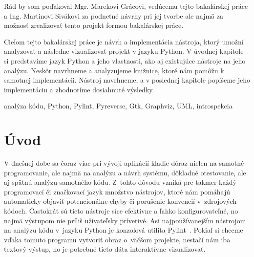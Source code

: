 \documentclass[11pt,oneside,final]{fithesis2}
\begin{document}
 \FrontMatter  
 \ThesisTitlePage

\begin{ThesisDeclaration}
\DeclarationText
\AdvisorName
\end{ThesisDeclaration}

\begin{ThesisThanks}
Rád by som poďakoval Mgr. Marekovi Grácovi, vedúcemu tejto bakalárskej práce a Ing. Martinovi Sivákovi za podnetné návrhy pri jej tvorbe ale najmä za možnosť zrealizovať tento projekt formou bakalárskej práce.
\end{ThesisThanks}

\begin{ThesisAbstract}
Cieľom tejto bakalárskej práce je návrh a implementácia nástroja, ktorý umožní analyzovať a následne vizualizovať projekt v jazyku Python. V úvodnej kapitole si predstavíme jazyk Python a jeho vlastnosti, ako aj existujúce nástroje na jeho analýzu. Neskôr navrhneme a analyzujeme knižnice, ktoré nám pomôžu k samotnej implementácii. Nástroj navrhneme, a v poslednej kapitole popíšeme jeho implementáciu a zhodnotíme dosiahnuté výsledky.
\end{ThesisAbstract}

\begin{ThesisKeyWords}
analýza kódu, Python, Pylint, Pyreverse, Gtk, Graphviz, UML, introspekcia
\end{ThesisKeyWords}



\MainMatter  
\tableofcontents

\chapter{Úvod}

	V dnešnej dobe sa čoraz viac pri vývoji aplikácií kladie dôraz nielen na samotné programovanie, ale najmä na analýzu a návrh systému, dôkladné otestovanie, ale aj spätnú analýzu samotného kódu. Z~tohto dôvodu vzniká pre takmer každý programovací či značkovací jazyk množstvo nástrojov, ktoré nám pomáhajú automaticky objaviť potencionálne chyby či porušenie konvencií v~zdrojových kódoch. Častokrát sú tieto nástroje síce efektívne a ľahko konfigurovateľné, no najmä výstupom nie príliš užívateľsky prívetivé. Asi najpoužívanejším nástrojom na analýzu kódu v~jazyku Python je konzolová utilita Pylint~\cite{pylint}. Pokiaľ si chceme vďaka tomuto programu vytvoriť obraz o~väčšom projekte, nestačí nám iba textový výstup, no je potrebné tieto dáta interaktívne vizualizovať.
	
\end{document}
